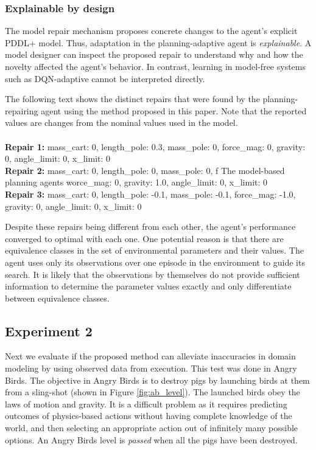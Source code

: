 \documentclass[letterpaper]{article} %
\newenvironment{console}{\ttfamily}{\par}
\begin{document}
\subsubsection{Explainable by design}
The model repair mechanism proposes concrete changes to the agent's explicit PDDL+ model. Thus, adaptation in the planning-adaptive agent is \emph{explainable}. A model designer can inspect the proposed repair to understand why and how the novelty affected the agent's behavior. In contrast, learning in model-free systems such as DQN-adaptive cannot be interpreted directly. 

The following text shows the distinct repairs that were found by the planning-repairing agent using the method proposed in this paper. Note that the reported values are changes from the nominal values used in the model. \\
\\
\begin{console}
\small
     \textbf{Repair 1:} {mass\_cart: 0, length\_pole: 0.3, mass\_pole: 0, force\_mag: 0, gravity: 0, angle\_limit: 0, x\_limit: 0} \\
    \textbf{Repair 2:} {mass\_cart: 0, length\_pole: 0, mass\_pole: 0, f
The model-based planning agents worce\_mag: 0, gravity: 1.0, angle\_limit: 0, x\_limit: 0}
    \\
    \textbf{Repair 3:} {mass\_cart: 0, length\_pole: -0.1, mass\_pole: -0.1, force\_mag: -1.0, gravity: 0, angle\_limit: 0, x\_limit: 0}
\end{console}
\smallskip
Despite these repairs being different from each other, the agent's performance converged to optimal with each one. One potential reason is that there are equivalence classes in the set of environmental parameters and their values. The agent uses only its observations over one episode in the environment to guide its search. It is likely that the observations by themselves do not provide sufficient information to determine the parameter values exactly and only differentiate between equivalence classes. 

\subsection{Experiment 2}
Next we evaluate if the proposed method can alleviate inaccuracies in domain modeling by using observed data from execution. This test was done in Angry Birds. The objective in Angry Birds is to destroy pigs by launching birds at them from a sling-shot (shown in Figure \ref{fig:ab_level}). The launched birds obey the laws of motion and gravity. It is a difficult problem as it requires predicting outcomes of physics-based actions without having complete knowledge of the world, and then selecting an appropriate action out of infinitely many possible options. An Angry Birds level is \emph{passed} when all the pigs have been destroyed. 
\end{document}

